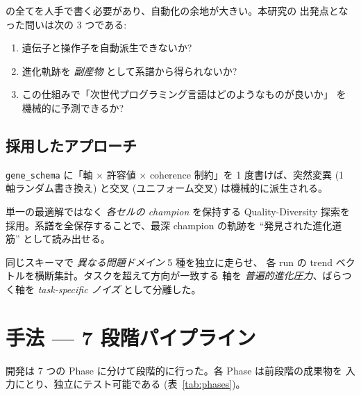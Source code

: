 \documentclass[a4paper,11pt]{article}
\begin{document}
\noindent
の全てを人手で書く必要があり、自動化の余地が大きい。本研究の
出発点となった問いは次の 3 つである:

\begin{enumerate}
  \item 遺伝子と操作子を自動派生できないか?
  \item 進化軌跡を {\itshape 副産物} として系譜から得られないか?
  \item この仕組みで「次世代プログラミング言語はどのようなものが良いか」
        を機械的に予測できるか?
\end{enumerate}

\subsection{採用したアプローチ}

\begin{description}[leftmargin=8mm,labelsep=4mm]
  \item[(1) スキーマ駆動]
    \texttt{gene\_schema} に「軸 \(\times\) 許容値 \(\times\)
    coherence 制約」を 1 度書けば、突然変異 (1 軸ランダム書き換え)
    と交叉 (ユニフォーム交叉) は機械的に派生される。
  \item[(2) MAP-Elites]
    単一の最適解ではなく {\itshape 各セルの champion} を保持する
    Quality-Diversity 探索を採用。系譜を全保存することで、最深
    champion の軌跡を ``発見された進化道筋'' として読み出せる。
  \item[(3) 多タスク横断]
    同じスキーマで {\itshape 異なる問題ドメイン} 5 種を独立に走らせ、
    各 run の trend ベクトルを横断集計。タスクを超えて方向が一致する
    軸を {\itshape 普遍的進化圧力}、ばらつく軸を
    {\itshape task-specific ノイズ} として分離した。
\end{description}

\section{手法 — 7 段階パイプライン}

開発は 7 つの Phase に分けて段階的に行った。各 Phase は前段階の成果物を
入力にとり、独立にテスト可能である (表~\ref{tab:phases})。
\end{document}
